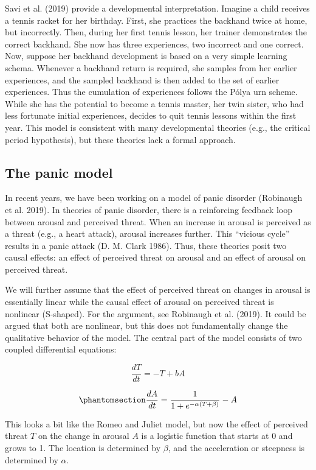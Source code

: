 \documentclass[
  a4paper,
  DIV=11,
  numbers=noendperiod,
  oneside]{scrreprt}
\begin{document}
Savi et al. (2019) provide a developmental interpretation. Imagine a
child receives a tennis racket for her birthday. First, she practices
the backhand twice at home, but incorrectly. Then, during her first
tennis lesson, her trainer demonstrates the correct backhand. She now
has three experiences, two incorrect and one correct. Now, suppose her
backhand development is based on a very simple learning schema. Whenever
a backhand return is required, she samples from her earlier experiences,
and the sampled backhand is then added to the set of earlier
experiences. Thus the cumulation of experiences follows the Pólya urn
scheme. While she has the potential to become a tennis master, her twin
sister, who had less fortunate initial experiences, decides to quit
tennis lessons within the first year. This model is consistent with many
developmental theories (e.g., the critical period hypothesis), but these
theories lack a formal approach.

\subsection{The panic model}\label{sec-The-panic-model}

In recent years, we have been working on a model of panic disorder
(Robinaugh et al. 2019). In theories of panic disorder, there is a
reinforcing feedback loop between arousal and perceived threat. When an
increase in arousal is perceived as a threat (e.g., a heart attack),
arousal increases further. This ``vicious cycle'' results in a panic
attack (D. M. Clark 1986). Thus, these theories posit two causal
effects: an effect of perceived threat on arousal and an effect of
arousal on perceived threat.

We will further assume that the effect of perceived threat on changes in
arousal is essentially linear while the causal effect of arousal on
perceived threat is nonlinear (S-shaped). For the argument, see
Robinaugh et al. (2019). It could be argued that both are nonlinear, but
this does not fundamentally change the qualitative behavior of the
model. The central part of the model consists of two coupled
differential equations:

\[\frac{dT}{dt} = - T + bA\]

\begin{equation}\phantomsection\label{eq-ch4n-14-old-34}{
\frac{dA}{dt} = \frac{1}{1 + e^{- \alpha(T + \beta)}} - A
}\end{equation}

This looks a bit like the Romeo and Juliet model, but now the effect of
perceived threat \(T\) on the change in arousal \(A\) is a logistic
function that starts at 0 and grows to 1. The location is determined by
\(\beta\), and the acceleration or steepness is determined by
\(\alpha\).
\end{document}
